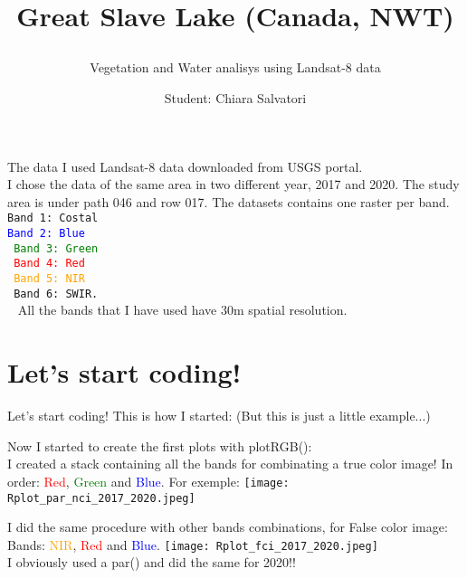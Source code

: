 \documentclass{beamer}
\title{{Great Slave Lake (Canada, NWT)}
\subtitle{{Vegetation and Water analisys using Landsat-8 data}}
}
\date{}
\author{\footnotesize{Student: Chiara Salvatori}}
\institute{
 Exam: Telerilevamento Geo-Ecologico.
 
    Professore: Duccio Rocchini
    \\
 \smallskip
 \texttt{[image: great\_slave\_lake\_intro.jpg]}
}
\begin{document}
\maketitle
\begin{frame}{The data}
    I used Landsat-8 data downloaded from USGS portal. \\ I chose the data of the same area in two different year, 2017 and 2020. The study area is under path 046 and row 017. The datasets contains one raster per band. \\ 
    \bigskip
    \texttt{\small{Band 1: Costal\\
    \textcolor{blue}{Band 2: Blue\\}
    \textcolor{green}{Band 3: Green\\}
    \textcolor{red}{Band 4: Red\\}
    \textcolor{orange}{Band 5: NIR\\}
    Band 6: SWIR. \\}
    }
    \bigskip
    All the bands that I have used have 30m spatial resolution.
\end{frame}

\section{Let's start coding!}
\begin{frame}{Let's start coding!}
 This is how I started: 
 (But this is just a little example...)
 \bigskip
    \texttt{\scriptsize{}}
    \
\end{frame}

\begin{frame}%
 Now I started to create the first plots with plotRGB():\\
 I created a stack containing all the bands for combinating a true color image! In order: \textcolor{red}{Red}, \textcolor{green}{Green} and \textcolor{blue}{Blue}.
 For exemple: 
    \texttt{\scriptsize{}}
    \texttt{[image: Rplot\_par\_nci\_2017\_2020.jpeg]}\\
\end{frame}

\begin{frame}%
 I did the same procedure with other bands combinations, for False color image:  Bands: \textcolor{orange}{NIR}, \textcolor{red}{Red} and \textcolor{blue}{Blue}.
    \texttt{\scriptsize{}}
    \texttt{[image: Rplot\_fci\_2017\_2020.jpeg]}\\
    I obviously used a par() and did the same for 2020!!
\end{frame}
\end{document}
